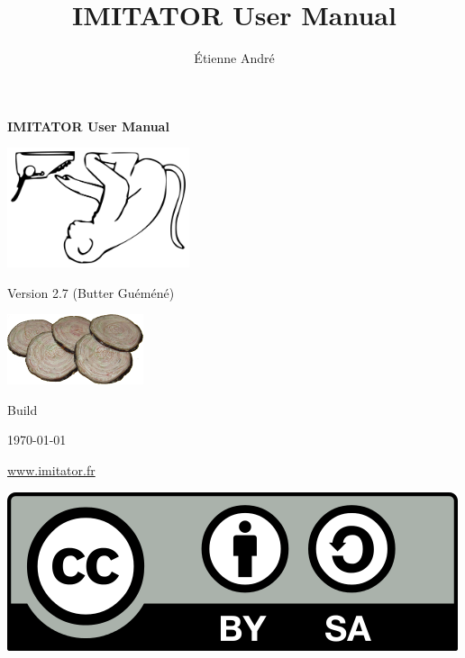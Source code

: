 \documentclass[a4paper,11pt]{report}
\title{IMITATOR User Manual}
\author{Étienne André}
\newcommand{\imitatorversion}{2.7}
\newcommand{\imitatorversionname}{Butter Guéméné}
\begin{document}

\sloppy


\thispagestyle{empty}

\mbox{}

\vspace{2cm}

\begin{center}
	{\Huge \bfseries IMITATOR User Manual}

	\vspace{2cm}

	\includegraphics[width=0.40\textwidth]{../logos/imitator-500.png}

	\vspace{2cm}
	
	{\Large Version \imitatorversion{} (\imitatorversionname{})}
	
	\medskip
	
	\includegraphics[width=0.30\textwidth]{../logos/logo2-7-300.png}

\end{center}

\vspace{2cm}

{\small \hfill{}Build }

{\small \hfill{}\today{}}

\vspace{2cm}

\begin{center}
 	{\Large \url{www.imitator.fr}}
 	
\end{center}
\hfill\includegraphics[width=.15\textwidth]{images/CC-BY-SA_500.png}
\end{document}
